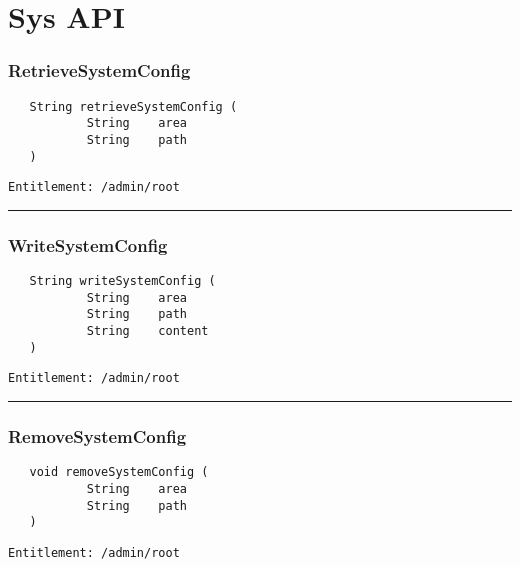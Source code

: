 \chapter{Sys API}

\subsection{RetrieveSystemConfig}
\label{Api:RetrieveSystemConfig}
\begin{verbatim}
   String retrieveSystemConfig (
           String    area
           String    path
   )
\end{verbatim}
\begin{Verbatim}[fontsize=\small, formatcom=\color{Maroon}]
  Entitlement: /admin/root
\end{Verbatim}



\rule{12cm}{2pt}
\subsection{WriteSystemConfig}
\label{Api:WriteSystemConfig}
\begin{verbatim}
   String writeSystemConfig (
           String    area
           String    path
           String    content
   )
\end{verbatim}
\begin{Verbatim}[fontsize=\small, formatcom=\color{Maroon}]
  Entitlement: /admin/root
\end{Verbatim}



\rule{12cm}{2pt}
\subsection{RemoveSystemConfig}
\label{Api:RemoveSystemConfig}
\begin{verbatim}
   void removeSystemConfig (
           String    area
           String    path
   )
\end{verbatim}
\begin{Verbatim}[fontsize=\small, formatcom=\color{Maroon}]
  Entitlement: /admin/root
\end{Verbatim}



